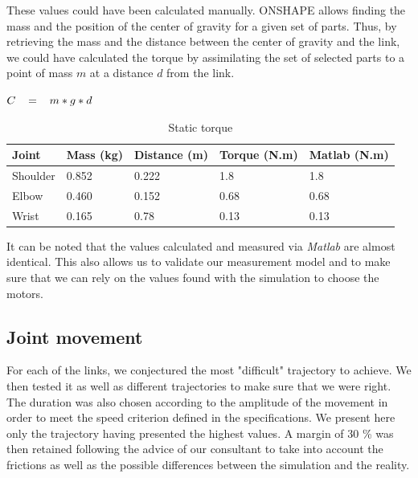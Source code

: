 \bigbreak
These values could have been calculated manually. ONSHAPE allows finding the mass and the position of the center of gravity for a given set of parts. Thus, by retrieving the mass and the distance between the center of gravity and the link, we could have calculated the torque by assimilating the set of selected parts to a point of mass $m$ at a distance $d$ from the link.
\begin{center}
    $C\hspace*{0.3cm}=\hspace*{0.3cm}m*g*d$
\end{center}
\begin{table}[ht]
    \centering
    \begin{tabular}{|p{1.5cm} | p{2cm} | p{2.5cm}| p{2.7cm} | p{2.7cm} |} 
        \hline
        \textbf{Joint} & \textbf{Mass (kg)} & \textbf{Distance (m)}& \textbf{Torque (N.m)}& \textbf{Matlab (N.m)}\\ [0.3ex] 
        \hline
        Shoulder & 0.852 & 0.222 & 1.8 & 1.8 \\ 
        \hline
        Elbow & 0.460 & 0.152 & 0.68 & 0.68 \\ 
        \hline
        Wrist & 0.165 & 0.78 & 0.13 & 0.13 \\ 
        \hline
    \end{tabular}
    \caption{Static torque}
\end{table}
\FloatBarrier

\bigbreak
It can be noted that the values calculated and measured via \textit{Matlab} are almost identical. This also allows us to validate our measurement model and to make sure that we can rely on the values found with the simulation to choose the motors.

\subsection{Joint movement}

For each of the links, we conjectured the most "difficult" trajectory to achieve. We then tested it as well as different trajectories to make sure that we were right. The duration was also chosen according to the amplitude of the movement in order to meet the speed criterion defined in the specifications. We present here only the trajectory having presented the highest values. A margin of 30 \% was then retained following the advice of our consultant to take into account the frictions as well as the possible differences between the simulation and the reality.

